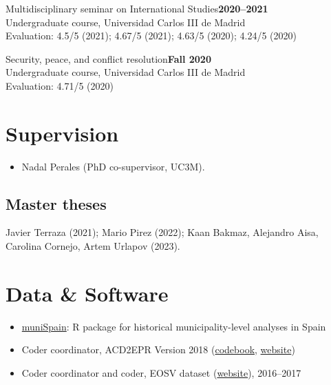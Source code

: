 \documentclass[a4paper, 12pt]{article}
\begin{document}
\noindent
Multidisciplinary seminar on International Studies\hfill\textbf{2020--2021}\\
{\small Undergraduate course, Universidad Carlos III de Madrid}\\
{\small Evaluation: 4.5/5 (2021); 4.67/5 (2021); 4.63/5 (2020); 4.24/5 (2020)}
\vspace{10pt}

\noindent
Security, peace, and conflict resolution\hfill\textbf{Fall 2020}\\
{\small Undergraduate course, Universidad Carlos III de Madrid}\\
{\small Evaluation: 4.71/5 (2020)}

\section*{Supervision}

\begin{itemize}[leftmargin=*, nolistsep]
	\item Nadal Perales (PhD co-supervisor, UC3M).
\end{itemize}

\vspace{-10pt}
\subsection*{Master theses}

Javier Terraza (2021);
Mario Pirez (2022);
Kaan Bakmaz, Alejandro Aisa, Carolina Cornejo, Artem Urlapov (2023).


\section*{Data \& Software}

\begin{itemize}[leftmargin=*, nolistsep]
  \item \href{https://github.com/franvillamil/muniSpain}{muniSpain}: R package for historical municipality-level analyses in Spain
	\item Coder coordinator, ACD2EPR Version 2018 (\href{https://icr.ethz.ch/data/epr/acd2epr/ACD2EPR-2018_Codebook.pdf}{codebook,} \href{https://icr.ethz.ch/data/epr/acd2epr/}{website})
	\item Coder coordinator and coder, EOSV dataset (\href{https://snis.ch/project/civilian-victimization-conflict-escalation/}{website}), 2016--2017
\end{itemize}
\end{document}
